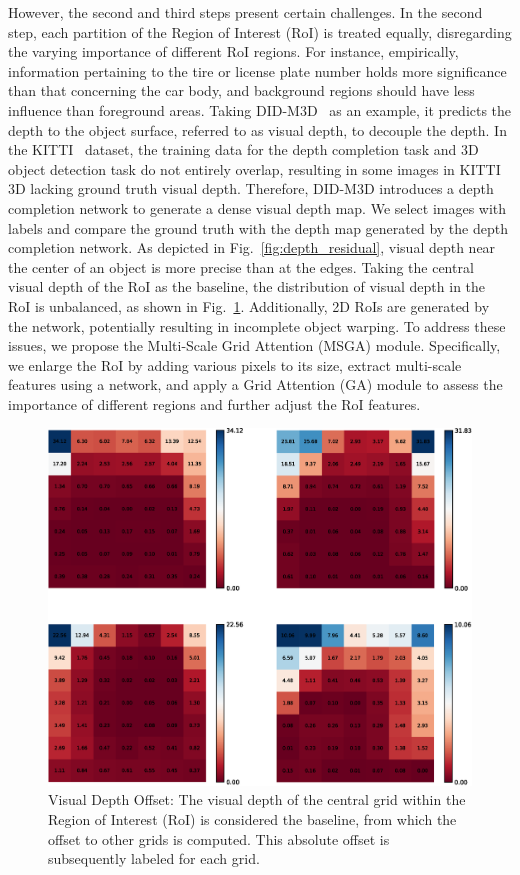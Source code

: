 \documentclass[journal]{IEEEtran}
\begin{document}
	However, the second and third steps present certain challenges. In the second step, each partition of the Region of Interest (RoI) is treated equally, disregarding the varying importance of different RoI regions. For instance, empirically, information pertaining to the tire or license plate number holds more significance than that concerning the car body, and background regions should have less influence than foreground areas. Taking DID-M3D~\cite{didm3d} as an example, it predicts the depth to the object surface, referred to as visual depth, to decouple the depth. In the KITTI~\cite{kitti} dataset, the training data for the depth completion task and 3D object detection task do not entirely overlap, resulting in some images in KITTI 3D lacking ground truth visual depth. Therefore, DID-M3D introduces a depth completion network to generate a dense visual depth map. We select images with labels and compare the ground truth with the depth map generated by the depth completion network. As depicted in Fig.~\ref{fig:depth_residual}, visual depth near the center of an object is more precise than at the edges. Taking the central visual depth of the RoI as the baseline, the distribution of visual depth in the RoI is unbalanced, as shown in Fig.~\ref{fig:visual_depth_offset}. Additionally, 2D RoIs are generated by the network, potentially resulting in incomplete object warping. To address these issues, we propose the Multi-Scale Grid Attention (MSGA) module. Specifically, we enlarge the RoI by adding various pixels to its size, extract multi-scale features using a network, and apply a Grid Attention (GA) module to assess the importance of different regions and further adjust the RoI features.

	\begin{figure}[!t]
		\centering
		\includegraphics[width=1.0\linewidth]{Figures/visual_depth_offset/visual_depth_offset.eps}
		\caption{Visual Depth Offset: The visual depth of the central grid within the Region of Interest (RoI) is considered the baseline, from which the offset to other grids is computed. This absolute offset is subsequently labeled for each grid.}
		\label{fig:visual_depth_offset}
	\end{figure}
	
\end{document}
